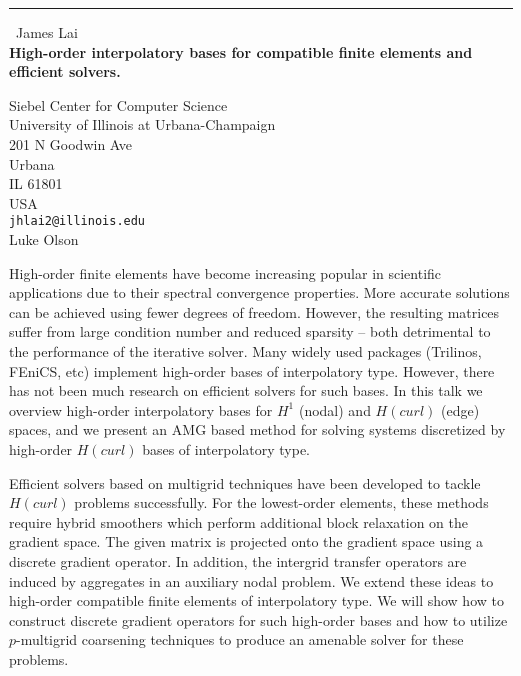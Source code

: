 \documentclass{report}
\begin{document}
\begin{center}
\rule{6in}{1pt} \
{\large James Lai \\
{\bf High-order interpolatory bases for compatible finite elements and efficient solvers.}}

Siebel Center for Computer Science \\ University of Illinois at Urbana-Champaign \\ 201 N Goodwin Ave \\ Urbana \\ IL 61801 \\ USA
\\
{\tt jhlai2@illinois.edu}\\
Luke Olson\end{center}

High-order finite elements have become increasing popular in scientific
applications due to their spectral convergence properties. More accurate
solutions can be achieved using fewer degrees of freedom. However, the
resulting matrices suffer from large condition number and reduced
sparsity -- both detrimental to the performance of the iterative solver.
Many widely used packages (Trilinos, FEniCS, etc) implement high-order
bases of interpolatory type. However, there has not been much research on
efficient solvers for such bases. In this talk we overview high-order
interpolatory bases for $H^1$ (nodal) and $H(curl)$ (edge) spaces, and we
present an AMG based method for solving systems discretized by high-order
$H(curl)$ bases of interpolatory type.

Efficient solvers based on multigrid techniques have been developed to
tackle $H(curl)$ problems successfully. For the lowest-order elements,
these methods require hybrid smoothers which perform additional block
relaxation on the gradient space. The given matrix is projected onto the
gradient space using a discrete gradient operator. In addition, the
intergrid transfer operators are induced by aggregates in an auxiliary
nodal problem. We extend these ideas to high-order compatible finite
elements of interpolatory type. We will show how to construct discrete
gradient operators for such high-order bases and how to utilize
$p$-multigrid coarsening techniques to produce an amenable solver for
these problems.
\end{document}
